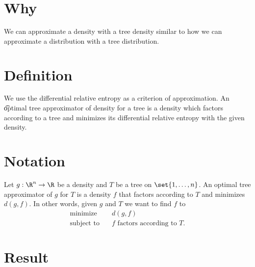 

\section*{Why}

We can approximate a density with a tree density similar to how we can approximate a distribution with a tree distribution.

\section*{Definition}

We use the differential relative entropy as a criterion of approximation.
An \t{optimal tree approximator} of density for a tree is a density which factors according to a tree and minimizes its differential relative entropy with the given density.

\section*{Notation}

Let $g: \R ^n \to \R $ be a density and $T$ be a tree on $\set{1, \dots , n}$.
An optimal tree approximator of $g$ for $T$ is a density $f$ that factors according to $T$ and minimizes $d(g, f)$.
In other words, given $g$ and $T$ we want to find $f$ to
    \[
\begin{aligned}
\text{minimize} &\quad d(g, f) \\
\text{subject to} &\quad f \text{ factors according to } T.
\end{aligned}
    \]
  \section*{Result}



